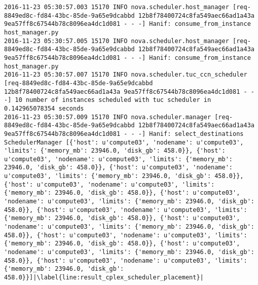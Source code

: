 \begin{lstlisting}[frame=single, caption={The cPlex based scheduler log trace for 10 virtual instances}, label={lst:tucschedulercodetracelog10vi}, escapechar=|]
2016-11-23 05:30:57.003 15170 INFO nova.scheduler.host_manager [req-8849ed8c-fd84-43bc-85de-9a65e9dcabbd 12b8f78400724c8fa549aec66ad1a43a 9ea57ff8c67544b78c8096ea4dc1d081 - - -] Hanif: consume_from_instance host_manager.py
2016-11-23 05:30:57.005 15170 INFO nova.scheduler.host_manager [req-8849ed8c-fd84-43bc-85de-9a65e9dcabbd 12b8f78400724c8fa549aec66ad1a43a 9ea57ff8c67544b78c8096ea4dc1d081 - - -] Hanif: consume_from_instance host_manager.py
2016-11-23 05:30:57.007 15170 INFO nova.scheduler.tuc_ccn_scheduler [req-8849ed8c-fd84-43bc-85de-9a65e9dcabbd 12b8f78400724c8fa549aec66ad1a43a 9ea57ff8c67544b78c8096ea4dc1d081 - - -] 10 number of instances scheduled with tuc scheduler in 0.142965078354 seconds
2016-11-23 05:30:57.009 15170 INFO nova.scheduler.manager [req-8849ed8c-fd84-43bc-85de-9a65e9dcabbd 12b8f78400724c8fa549aec66ad1a43a 9ea57ff8c67544b78c8096ea4dc1d081 - - -] Hanif: select_destinations SchedulerManager [{'host': u'compute03', 'nodename': u'compute03', 'limits': {'memory_mb': 23946.0, 'disk_gb': 458.0}}, {'host': u'compute03', 'nodename': u'compute03', 'limits': {'memory_mb': 23946.0, 'disk_gb': 458.0}}, {'host': u'compute03', 'nodename': u'compute03', 'limits': {'memory_mb': 23946.0, 'disk_gb': 458.0}}, {'host': u'compute03', 'nodename': u'compute03', 'limits': {'memory_mb': 23946.0, 'disk_gb': 458.0}}, {'host': u'compute03', 'nodename': u'compute03', 'limits': {'memory_mb': 23946.0, 'disk_gb': 458.0}}, {'host': u'compute03', 'nodename': u'compute03', 'limits': {'memory_mb': 23946.0, 'disk_gb': 458.0}}, {'host': u'compute03', 'nodename': u'compute03', 'limits': {'memory_mb': 23946.0, 'disk_gb': 458.0}}, {'host': u'compute03', 'nodename': u'compute03', 'limits': {'memory_mb': 23946.0, 'disk_gb': 458.0}}, {'host': u'compute03', 'nodename': u'compute03', 'limits': {'memory_mb': 23946.0, 'disk_gb': 458.0}}, {'host': u'compute03', 'nodename': u'compute03', 'limits': {'memory_mb': 23946.0, 'disk_gb': 458.0}}]|\label{line:result_cplex_scheduler_placement}|
\end{lstlisting}

